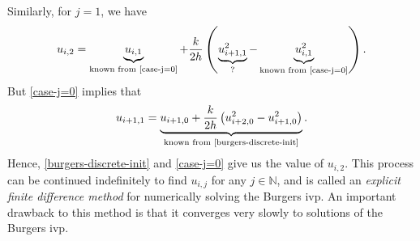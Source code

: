 \documentclass[12pt,reqno]{amsart}
\numberwithin{equation}{section}  %
\numberwithin{figure}{section}
\theoremstyle{plain}
\theoremstyle{definition}
\theoremstyle{remark}
\begin{document}
%
%
Similarly, for $j=1$, we have
%
%
\begin{equation*}
	\begin{split}
		u_{i,2} = \underbrace{u_{i,1}}_{\text{known from
		\eqref{case-j=0}}} + \frac{k}{2h}\left(
		\underbrace{u_{i+1,1}^{2}}_{?} -
		\underbrace{u_{i,1}^{2}}_{\text{known from
		\eqref{case-j=0}}} \right).
	\end{split}
\end{equation*}
%
%
But \eqref{case-j=0} implies that
\begin{equation*}
	\begin{split}
		u_{i+1,1} = \underbrace{u_{i+1,0} + \frac{k}{2h}\left( u_{i+2,0}^{2} -
		u_{i+1,0}^{2} \right)}_{\text{known from \eqref{burgers-discrete-init}}}.
	\end{split}
\end{equation*}
Hence, \eqref{burgers-discrete-init} and \eqref{case-j=0} give us the value of $u_{i,2}$. This process can be
continued indefinitely to find $u_{i, j}$ for any $j \in \mathbb{N}$, and is
called an \emph{explicit finite difference method} for numerically solving the
Burgers ivp. An important drawback to this method is that it converges very
slowly to solutions of the Burgers ivp. 
%
%
%
\begin{bibdiv}
\begin{biblist}



\end{biblist}
\end{bibdiv}
									
\end{document}
